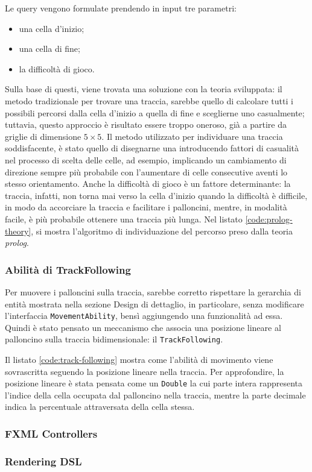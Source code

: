 

Le query vengono formulate prendendo in input tre parametri:
\begin{itemize}
    \item una cella d'inizio;
    \item una cella di fine;
    \item la difficoltà di gioco.
\end{itemize}

Sulla base di questi, viene trovata una soluzione con la teoria sviluppata: il metodo tradizionale per trovare una
traccia, sarebbe quello di calcolare tutti i possibili percorsi dalla cella d'inizio a quella di fine e sceglierne uno
casualmente; tuttavia, questo approccio è risultato essere troppo oneroso, già a partire da griglie di dimensione
$5 \times 5$. Il metodo utilizzato per individuare una traccia soddisfacente, è stato quello di disegnarne una
introducendo fattori di casualità nel processo di scelta delle celle, ad esempio, implicando un cambiamento di direzione
sempre più probabile con l'aumentare di celle consecutive aventi lo stesso orientamento. Anche la difficoltà di gioco
è un fattore determinante: la traccia, infatti, non torna mai verso la cella d'inizio quando la difficoltà è difficile,
in modo da accorciare la traccia e facilitare i palloncini, mentre, in modalità facile, è più probabile ottenere una
traccia più lunga. Nel listato \ref{code:prolog-theory}, si mostra l'algoritmo di individuazione del percorso preso
dalla teoria \textit{prolog}.



\subsubsection{Abilità di TrackFollowing}
Per muovere i palloncini sulla traccia, sarebbe corretto rispettare la gerarchia di entità mostrata nella sezione
Design di dettaglio, in particolare, senza modificare l'interfaccia \texttt{MovementAbility}, bensì aggiungendo una
funzionalità ad essa. Quindi è stato pensato un meccanismo che associa una posizione lineare al palloncino sulla
traccia bidimensionale: il \texttt{TrackFollowing}.



Il listato \ref{code:track-following} mostra come l'abilità di movimento viene sovrascritta seguendo la posizione
lineare nella traccia. Per approfondire, la posizione lineare è stata pensata come un \texttt{Double} la cui parte
intera rappresenta l'indice della cella occupata dal palloncino nella traccia, mentre la parte decimale indica la
percentuale attraversata della cella stessa.

\subsubsection{FXML Controllers}
\subsubsection{Rendering DSL}


